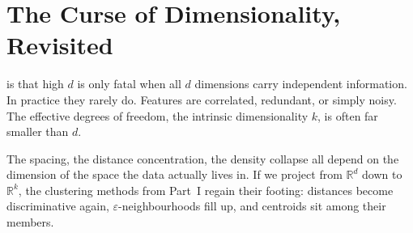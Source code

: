 \newpage

\section{The Curse of Dimensionality, Revisited}

 is that high $d$ is only fatal when all $d$ dimensions carry independent information.
In practice they rarely do.
Features are correlated, redundant, or simply noisy.
The effective degrees of freedom, the intrinsic dimensionality $k$, is often far smaller than $d$.

\begin{marginfigure}
\centering
{}
\caption{Mean nearest-neighbour spacing $d_{\mathrm{NN}} \propto N^{-1/d}$ for $N{=}100$ points. By $d{=}50$ every point is nearly as far from its neighbour as from the boundary. But if the data only occupies $k \ll d$ effective dimensions, the curse applies to $k$, not $d$.}
\label{fig:nn_spacing_curse}
\end{marginfigure}

The spacing, the distance concentration, the density collapse all depend on the dimension of the space the data actually lives in.
If we project from $\mathbb{R}^{d}$ down to $\mathbb{R}^{k}$, the clustering methods from Part~I regain their footing: distances become discriminative again, $\varepsilon$-neighbourhoods fill up, and centroids sit among their members.

